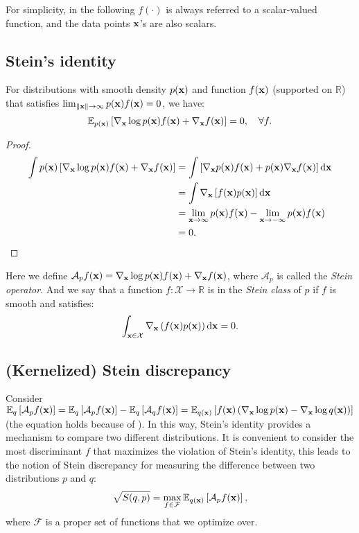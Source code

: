 \documentclass{article}
\begin{document}
For simplicity, in the following $f(\cdot)$ is always referred to a scalar-valued function, and the data points ${\mathbf{x}}$'s are also scalars. 

\subsection{Stein's identity}
For distributions with smooth density $p({\mathbf{x}})$ and function $f({\mathbf{x}})$ (supported on $\mathbb{R}$) that satisfies $\lim_{\|{\mathbf{x}}\| \to \infty} p({\mathbf{x}})f({\mathbf{x}}) = 0$, we have:
\begin{equation}\label{eq.SteinIdentity}
    \mathbb{E}_{p({\mathbf{x}})}\left[ \nabla_{\mathbf{x}}\log p({\mathbf{x}}) f({\mathbf{x}}) + \nabla_{\mathbf{x}} f({\mathbf{x}}) \right] = 0, \quad \forall f.
\end{equation}
\begin{proof}[Proof]
    \begin{equation}
        \begin{aligned}
            \int p({\mathbf{x}})\left[ \nabla_{\mathbf{x}} \log p({\mathbf{x}}) f({\mathbf{x}}) + \nabla_{\mathbf{x}} f({\mathbf{x}})\right] &= \int \left[ \nabla_{\mathbf{x}} p({\mathbf{x}}) f({\mathbf{x}}) + p({\mathbf{x}})\nabla_{\mathbf{x}} f({\mathbf{x}}) \right] \mathrm{d} {\mathbf{x}} \\
            &= \int \nabla_{\mathbf{x}}\left[ f({\mathbf{x}})p({\mathbf{x}}) \right]\mathrm{d}{\mathbf{x}} \\
            &= \lim_{{\mathbf{x}} \to \infty} p({\mathbf{x}})f({\mathbf{x}}) - \lim_{{\mathbf{x}} \to -\infty} p({\mathbf{x}})f({\mathbf{x}}) \\
            &= 0.
        \end{aligned}
    \end{equation}
\end{proof}
\noindent Here we define $\mathcal{A}_pf({\mathbf{x}}) = \nabla_{\mathbf{x}}\log p({\mathbf{x}}) f({\mathbf{x}}) + \nabla_{\mathbf{x}} f({\mathbf{x}})$, where $\mathcal{A}_p$ is called the \textit{Stein operator}. And we say that a function $f: \mathcal{X} \to \mathbb{R}$ is in the \textit{Stein class} of $p$ if $f$ is smooth and satisfies:
\begin{equation}
    \int_{{\mathbf{x}} \in \mathcal{X}} \nabla_{\mathbf{x}} \left( f({\mathbf{x}}) p({\mathbf{x}}) \right)\mathrm{d} {\mathbf{x}} = 0.
\end{equation}

\subsection{(Kernelized) Stein discrepancy}
Consider $\mathbb{E}_q\left[ \mathcal{A}_pf({\mathbf{x}}) \right] = \mathbb{E}_q\left[ \mathcal{A}_pf({\mathbf{x}}) \right] - \mathbb{E}_q\left[ \mathcal{A}_qf({\mathbf{x}}) \right] = \mathbb{E}_{q({\mathbf{x}})}\left[ f({\mathbf{x}})\left( \nabla_{\mathbf{x}}\log p({\mathbf{x}}) - \nabla_{\mathbf{x}} \log q({\mathbf{x}}) \right) \right]$ (the equation holds because of ). In this way, Stein's identity provides a mechanism to compare two different distributions. It is convenient to consider the most discriminant $f$ that maximizes the violation of Stein's identity, this leads to the notion of Stein discrepancy for measuring the difference between two distributions $p$ and $q$:
\begin{equation}\label{eq.SD}
    \sqrt{S(q, p)} = \max_{f \in \mathcal{F}}\mathbb{E}_{q({\mathbf{x}})}\left[\mathcal{A}_p f({\mathbf{x}})\right],
\end{equation}
where $\mathcal{F}$ is a proper set of functions that we optimize over.
\end{document}
